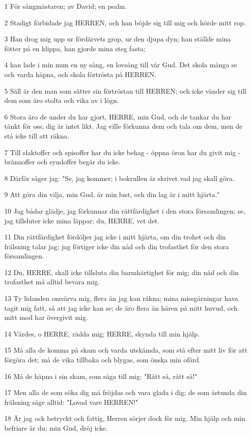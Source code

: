 \par 1 För sångmästaren; av David; en psalm.
\par 2 Stadigt förbidade jag HERREN, och han böjde sig till mig och hörde mitt rop.
\par 3 Han drog mig upp ur fördärvets grop, ur den djupa dyn; han ställde mina fötter på en klippa, han gjorde mina steg fasta;
\par 4 han lade i min mun en ny sång, en lovsång till vår Gud. Det skola många se och varda häpna, och skola förtrösta på HERREN.
\par 5 Säll är den man som sätter sin förtröstan till HERREN; och icke vänder sig till dem som äro stolta och vika av i lögn.
\par 6 Stora äro de under du har gjort, HERRE, min Gud, och de tankar du har tänkt för oss; dig är intet likt. Jag ville förkunna dem och tala om dem, men de stå icke till att räkna.
\par 7 Till slaktoffer och spisoffer har du icke behag - öppna öron har du givit mig - brännoffer och syndoffer begär du icke.
\par 8 Därför säger jag: "Se, jag kommer; i bokrullen är skrivet vad jag skall göra.
\par 9 Att göra din vilja, min Gud, är min lust, och din lag är i mitt hjärta."
\par 10 Jag bådar glädje, jag förkunnar din rättfärdighet i den stora församlingen; se, jag tillsluter icke mina läppar; du, HERRE, vet det.
\par 11 Din rättfärdighet fördöljer jag icke i mitt hjärta, om din trohet och din frälsning talar jag; jag förtiger icke din nåd och din trofasthet för den stora församlingen.
\par 12 Du, HERRE, skall icke tillsluta din barmhärtighet för mig; din nåd och din trofasthet må alltid bevara mig.
\par 13 Ty lidanden omvärva mig, flera än jag kan räkna; mina missgärningar hava tagit mig fatt, så att jag icke kan se; de äro flera än håren på mitt huvud, och mitt mod har övergivit mig.
\par 14 Värdes, o HERRE, rädda mig; HERRE, skynda till min hjälp.
\par 15 Må alla de komma på skam och varda utskämda, som stå efter mitt liv för att förgöra det; må de vika tillbaka och blygas, som önska min ofärd.
\par 16 Må de häpna i sin skam, som säga till mig: "Rätt så, rätt så!"
\par 17 Men alla de som söka dig må fröjdas och vara glada i dig; de som åstunda din frälsning säge alltid: "Lovad vare HERREN!"
\par 18 Är jag ock betryckt och fattig, Herren sörjer dock för mig. Min hjälp och min befriare är du; min Gud, dröj icke.

